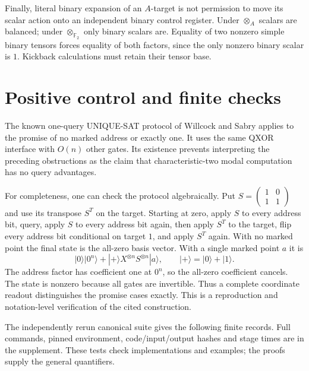 \documentclass[11pt]{article}
\newcommand{\F}{\mathbb F}
\begin{document}
Finally, literal binary expansion of an $A$-target is not permission to move its scalar action onto an independent binary control register. Under $\otimes_A$ scalars are balanced; under $\otimes_{\F_2}$ only binary scalars are. Equality of two nonzero simple binary tensors forces equality of both factors, since the only nonzero binary scalar is $1$. Kickback calculations must retain their tensor base.

\section{Positive control and finite checks}\label{sec:checks}
The known one-query UNIQUE-SAT protocol of Willcock and Sabry \cite{WillcockSabry2011} applies to the promise of no marked address or exactly one. It uses the same QXOR interface with $O(n)$ other gates. Its existence prevents interpreting the preceding obstructions as the claim that characteristic-two modal computation has no query advantages.

For completeness, one can check the protocol algebraically. Put $S=\left(\begin{smallmatrix}1&0\\1&1\end{smallmatrix}\right)$ and use its transpose $S^T$ on the target. Starting at zero, apply $S$ to every address bit, query, apply $S$ to every address bit again, then apply $S^T$ to the target, flip every address bit conditional on target $1$, and apply $S^T$ again. With no marked point the final state is the all-zero basis vector. With a single marked point $a$ it is
\[
 |0\rangle|0^n\rangle+|+\rangle X^{\otimes n}S^{\otimes n}|a\rangle,
 \qquad |+\rangle=|0\rangle+|1\rangle.
\]
The address factor has coefficient one at $0^n$, so the all-zero coefficient cancels. The state is nonzero because all gates are invertible. Thus a complete coordinate readout distinguishes the promise cases exactly. This is a reproduction and notation-level verification of the cited construction.

The independently rerun canonical suite gives the following finite records. Full commands, pinned environment, code/input/output hashes and stage times are in the supplement. These tests check implementations and examples; the proofs supply the general quantifiers.
\end{document}
